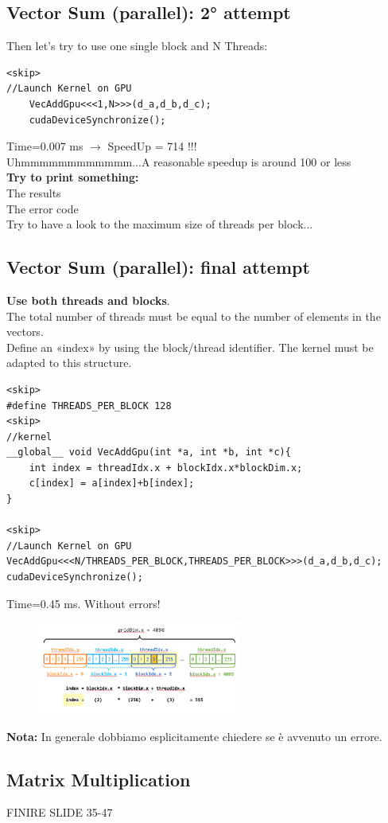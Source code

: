 \subsection{Vector Sum (parallel): 2° attempt}

Then let’s try to use one single block
and N Threads:

\begin{verbatim}
<skip>
//Launch Kernel on GPU
	VecAddGpu<<<1,N>>>(d_a,d_b,d_c);
	cudaDeviceSynchronize();
\end{verbatim}

Time=0.007 ms $\rightarrow$ SpeedUp = 714 !!!\\
Uhmmmmmmmmmmmm...A reasonable speedup is around 100 or less\\
\textbf{Try to print something:}\\
The results\\
The error code\\
Try to have a look to the maximum size of threads per block...

\subsection{Vector Sum (parallel): final attempt}

\textbf{Use both threads and blocks}.\\
The total number of threads must be equal to the number of elements in the vectors.\\ Define an «index» by using the block/thread identifier. The kernel must be adapted to this structure.

\begin{verbatim}
<skip>
#define THREADS_PER_BLOCK 128
<skip>
//kernel
__global__ void VecAddGpu(int *a, int *b, int *c){
	int index = threadIdx.x + blockIdx.x*blockDim.x;
	c[index] = a[index]+b[index];
}

<skip>
//Launch Kernel on GPU
VecAddGpu<<<N/THREADS_PER_BLOCK,THREADS_PER_BLOCK>>>(d_a,d_b,d_c);
cudaDeviceSynchronize();
\end{verbatim}

Time=0.45 ms. Without errors!

\begin{figure}[ht]
	\centering
	\includegraphics[width=0.6\textwidth]{figure_parallel/vector_sum_final.png}
\end{figure}

\noindent
\textbf{Nota:} In generale dobbiamo esplicitamente chiedere se è avvenuto un errore.

\subsection{Matrix Multiplication}
FINIRE SLIDE 35-47


